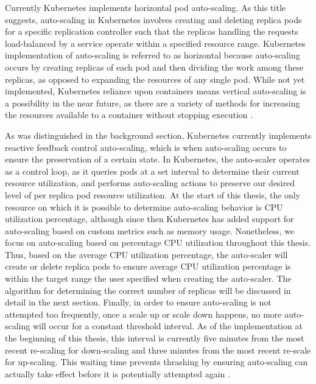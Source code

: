 Currently Kubernetes implements horizontal pod auto-scaling.
As this title suggests, auto-scaling in
Kubernetes involves creating and deleting replica pods for a specific replication
controller such that the replicas handling the requests load-balanced by a service
operate within a specified resource range. Kubernetes
implementation of auto-scaling is referred to as horizontal because
auto-scaling occurs by creating replicas of each pod and then dividing the work
among these replicas, as opposed to expanding the resources of any single pod.
While not yet implemented, Kubernetes reliance upon containers means vertical
auto-scaling is a possibility in the near future, as there are a variety of
methods for increasing the resources available to a container without stopping
execution \cite{docker-up-and-running}.

As was distinguished in the background section, Kubernetes currently implements reactive
feedback control auto-scaling, which is when auto-scaling occurs to
ensure the preservation of a certain state.
In Kubernetes, the auto-scaler operates as a control loop,
as it queries pods at a set interval to determine
their current resource utilization, and performs auto-scaling actions to
preserve our desired level of per replica pod resource utilization.
At the start of this thesis, the only resource on which it is possible to
determine auto-scaling behavior is CPU utilization percentage, although since
then Kubernetes has added support for auto-scaling based on custom metrics such
as memory usage. Nonetheless, we focus on auto-scaling based on percentage CPU
utilization throughout this thesis.
Thus, based on the average CPU utilization percentage, the
auto-scaler will create or delete replica pods to ensure average CPU utilization
percentage is within the target range the user specified when creating the
auto-scaler. The algorithm for determining the correct number of replicas
will be discussed in detail in the next section. Finally,
in order to ensure auto-scaling is not attempted too frequently, once a
scale up or scale down happens, no more auto-scaling will occur for a constant
threshold interval. As of the implementation at the beginning of this thesis,
this interval is currently five minutes from the most recent
re-scaling for down-scaling and three minutes from the most recent re-scale for
up-scaling. This waiting time prevents thrashing by ensuring
auto-scaling can actually take effect before it is potentially attempted again
\cite{k8s-horizontal-pod-autoscaler-user-guide}.
